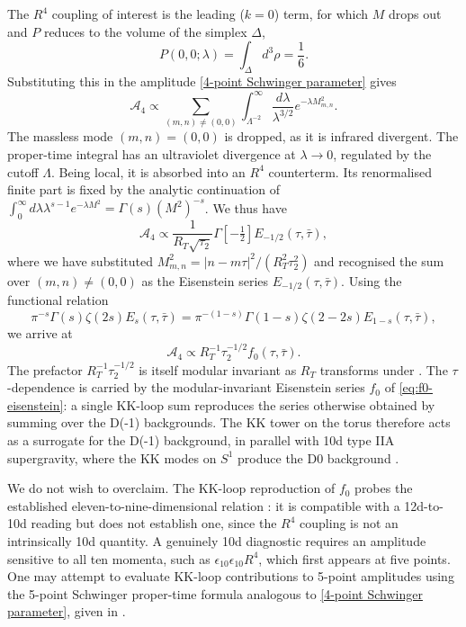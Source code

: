 The $R^4$ coupling of interest is the leading ($k=0$) term, for which $M$ drops out and $P$ reduces to the volume of the simplex $\Delta$,
\begin{equation}
P(0,0;\lambda) = \int_\Delta d^3\rho = \frac{1}{6}.
\end{equation}
Substituting this in the amplitude \eqref{4-point Schwinger parameter} gives
\begin{equation}
\mathcal{A}_4
\propto \sum_{(m,n)\neq(0,0)} \int_{\Lambda^{-2}}^\infty \frac{d\lambda}{\lambda^{3/2}}  e^{-\lambda M_{m,n}^2}.
\end{equation}
The massless mode $(m,n)=(0,0)$ is dropped, as it is infrared divergent.
The proper-time integral has an ultraviolet divergence at $\lambda\to0$, regulated by the cutoff $\Lambda$. 
Being local, it is absorbed into an $R^4$ counterterm.
Its renormalised finite part is fixed by the analytic continuation of $\int_0^\infty d\lambda \lambda^{s-1}e^{-\lambda M^2}=\Gamma(s)(M^2)^{-s}$.
We thus have
\begin{equation}
\mathcal{A}_4
\propto \frac{1}{R_T \sqrt{\tau_2}}\Gamma[-\tfrac{1}{2}] E_{-1/2}(\tau,\bar\tau),
\end{equation}
where we have substituted $M_{m,n}^2 = |n-m\tau|^2/(R_T^2\tau_2^2)$ and recognised the sum over $(m,n)\neq(0,0)$ as the Eisenstein series $E_{-1/2}(\tau,\bar\tau)$.
Using the functional relation
\begin{equation}
\pi^{-s}\Gamma(s)\zeta(2s)E_s(\tau,\bar\tau)=\pi^{-(1-s)}\Gamma(1-s)\zeta(2-2s)E_{1-s}(\tau,\bar\tau),
\end{equation}
we arrive at
\begin{equation}
\mathcal{A}_4 \propto R_T^{-1}\tau_2^{-1/2} f_0(\tau,\bar\tau).
\label{eq:KK-R4-coefficient}
\end{equation}
The prefactor $R_T^{-1}\tau_2^{-1/2}$ is itself modular invariant as $R_T$ transforms under \SLZ{}.
The $\tau$-dependence is carried by the modular-invariant Eisenstein series $f_0$ of \eqref{eq:f0-eisenstein}: a single KK-loop sum reproduces the series otherwise obtained by summing over the D(-1) backgrounds.
The KK tower on the torus therefore acts as a surrogate for the D(-1) background, in parallel with 10d type IIA supergravity, where the KK modes on $S^1$ produce the D0 background \cite{Green:1997as}.

We do not wish to overclaim.
The KK-loop reproduction of $f_0$ probes the established eleven-to-nine-dimensional relation \cite{Green:1997as}: it is compatible with a 12d-to-10d reading but does not establish one, since the $R^4$ coupling is not an intrinsically 10d quantity.
A genuinely 10d diagnostic requires an amplitude sensitive to all ten momenta, such as $\epsilon_{10}\epsilon_{10}R^4$, which first appears at five points.
One may attempt to evaluate KK-loop contributions to 5-point amplitudes using the 5-point Schwinger proper-time formula analogous to \eqref{4-point Schwinger parameter}, given in \cite{Minasian:2015bxa,Green:1999by,Liu:2022bfg}.

